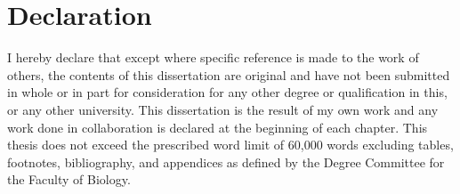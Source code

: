 \chapter*{Declaration}

I hereby declare that except where specific reference is made to the work of others, the contents of this dissertation are original and have not been submitted in whole or in part for consideration for any other degree or qualification in this, or any other university. This dissertation is the result of my own work and any work done in collaboration is declared at the beginning of each chapter. This thesis does not exceed the prescribed word limit of 60,000 words excluding tables, footnotes, bibliography, and appendices as defined by the Degree Committee for the Faculty of Biology.
